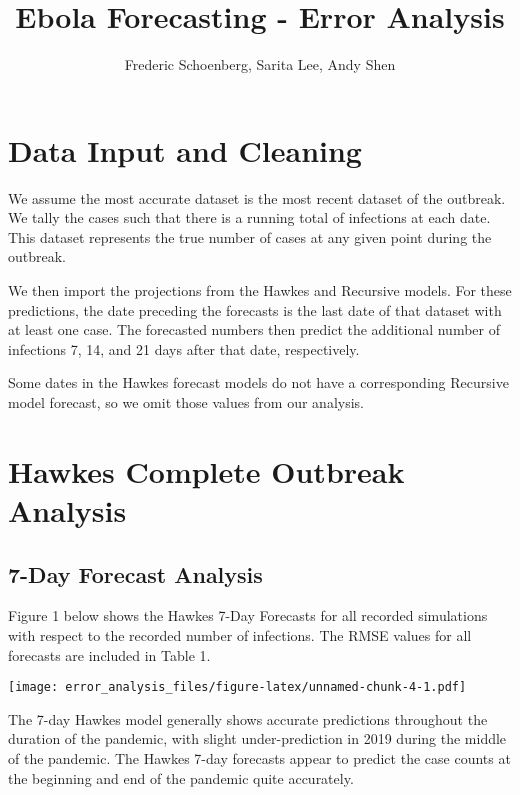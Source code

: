 \documentclass[
]{article}
\title{Ebola Forecasting - Error Analysis}
\author{Frederic Schoenberg, Sarita Lee, Andy Shen}
\date{}
\begin{document}
\maketitle

\hypertarget{data-input-and-cleaning}{%
\section{Data Input and Cleaning}\label{data-input-and-cleaning}}

We assume the most accurate dataset is the most recent dataset of the
outbreak. We tally the cases such that there is a running total of
infections at each date. This dataset represents the true number of
cases at any given point during the outbreak.

We then import the projections from the Hawkes and Recursive models. For
these predictions, the date preceding the forecasts is the last date of
that dataset with at least one case. The forecasted numbers then predict
the additional number of infections 7, 14, and 21 days after that date,
respectively.

Some dates in the Hawkes forecast models do not have a corresponding
Recursive model forecast, so we omit those values from our analysis.

\hypertarget{hawkes-complete-outbreak-analysis}{%
\section{Hawkes Complete Outbreak
Analysis}\label{hawkes-complete-outbreak-analysis}}

\hypertarget{day-forecast-analysis}{%
\subsection{7-Day Forecast Analysis}\label{day-forecast-analysis}}

Figure 1 below shows the Hawkes 7-Day Forecasts for all recorded
simulations with respect to the recorded number of infections. The RMSE
values for all forecasts are included in Table 1.\newline

\texttt{[image: error\_analysis\_files/figure-latex/unnamed-chunk-4-1.pdf]}

The 7-day Hawkes model generally shows accurate predictions throughout
the duration of the pandemic, with slight under-prediction in 2019
during the middle of the pandemic. The Hawkes 7-day forecasts appear to
predict the case counts at the beginning and end of the pandemic quite
accurately.
\end{document}

